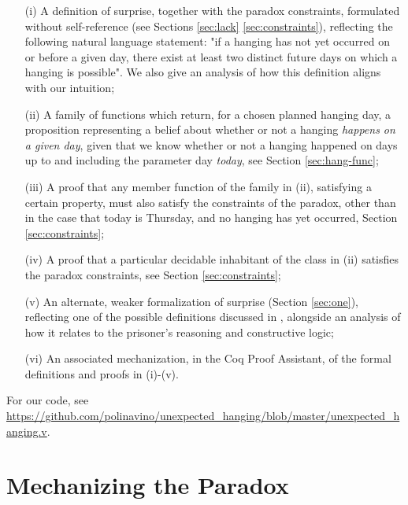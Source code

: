 \documentclass[runningheads]{llncs}
\begin{document}
  \begin{itemize}
    \item[(i)] A definition of surprise, together with the paradox
    constraints, formulated without self-reference (see
    Sections \ref{sec:lack} \ref{sec:constraints}), reflecting
    the following natural language statement: "if a hanging has not yet occurred on or before a given day,
    there exist at least two distinct future days on which a hanging
    is possible". We
    also give an analysis of how this definition aligns with our intuition;

    \item[(ii)] A family of functions which return, for a chosen planned hanging day,
    a proposition representing a belief about
    whether or not a hanging \emph{happens on a given day}, given that we know whether or not a hanging
    happened on days up to and including the parameter day \emph{today}, see Section \ref{sec:hang-func};

    \item[(iii)] A proof that any member function of the family in (ii), satisfying
    a certain property, must also satisfy the constraints of the paradox,
    other than in the case that today is Thursday, and no hanging has yet occurred,
    Section \ref{sec:constraints};

    \item[(iv)] A proof that a particular decidable inhabitant of the class in (ii)
    satisfies the paradox constraints, see Section \ref{sec:constraints};

    \item[(v)] An alternate, weaker formalization of surprise (Section \ref{sec:one}),
    reflecting one of the possible definitions discussed in \cite{fourpossible},
    alongside an analysis of how it relates to the prisoner's reasoning and
    constructive logic;

    \item[(vi)] An associated mechanization, in the Coq Proof Assistant, of the formal
    definitions and proofs in (i)-(v).
  \end{itemize}

  For our code, see \url{https://github.com/polinavino/unexpected_hanging/blob/master/unexpected_hanging.v}.

\section{Mechanizing the Paradox}
\label{sec:form}
\end{document}
